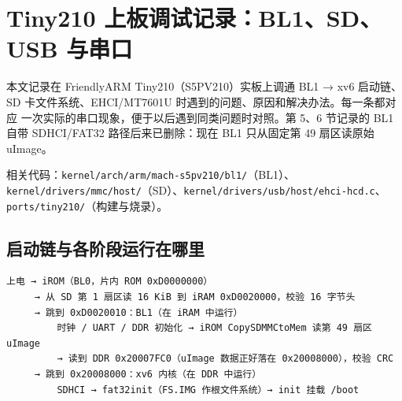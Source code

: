 \chapter{Tiny210 上板调试记录：BL1、SD、USB
与串口}\label{tiny210-ux4e0aux677fux8c03ux8bd5ux8bb0ux5f55bl1sdusb-ux4e0eux4e32ux53e3}

本文记录在 FriendlyARM Tiny210（S5PV210）实板上调通 BL1 → xv6 启动链、
SD 卡文件系统、EHCI/MT7601U 时遇到的问题、原因和解决办法。每一条都对应
一次实际的串口现象，便于以后遇到同类问题时对照。第 5、6 节记录的 BL1
自带 SDHCI/FAT32 路径后来已删除：现在 BL1 只从固定第 49 扇区读原始 uImage。

相关代码：\passthrough{\lstinline!kernel/arch/arm/mach-s5pv210/bl1/!}（BL1）、
\passthrough{\lstinline!kernel/drivers/mmc/host/!}（SD）、\passthrough{\lstinline!kernel/drivers/usb/host/ehci-hcd.c!}、
\passthrough{\lstinline!ports/tiny210/!}（构建与烧录）。

\section{启动链与各阶段运行在哪里}\label{ux542fux52a8ux94feux4e0eux5404ux9636ux6bb5ux8fd0ux884cux5728ux54eaux91cc}

\begin{lstlisting}
上电 → iROM（BL0，片内 ROM 0xD0000000）
     → 从 SD 第 1 扇区读 16 KiB 到 iRAM 0xD0020000，校验 16 字节头
     → 跳到 0xD0020010：BL1（在 iRAM 中运行）
         时钟 / UART / DDR 初始化 → iROM CopySDMMCtoMem 读第 49 扇区 uImage
         → 读到 DDR 0x20007FC0（uImage 数据正好落在 0x20008000），校验 CRC
     → 跳到 0x20008000：xv6 内核（在 DDR 中运行）
         SDHCI → fat32init（FS.IMG 作根文件系统）→ init 挂载 /boot
\end{lstlisting}

